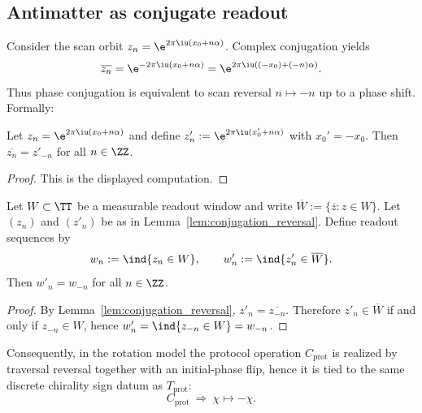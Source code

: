 \subsection{Antimatter as conjugate readout}
\label{subsec:antimatter_duality}

Consider the scan orbit $z_n=\e^{2\pi\iu(x_0+n\alpha)}$.
Complex conjugation yields
\[
\overline{z_n}=\e^{-2\pi\iu(x_0+n\alpha)}=\e^{2\pi\iu((-x_0)+(-n)\alpha)}.
\]
Thus phase conjugation is equivalent to scan reversal $n\mapsto -n$ up to a phase shift.
Formally:
\begin{lemma}\label{lem:conjugation_reversal}
Let $z_n=\e^{2\pi\iu(x_0+n\alpha)}$ and define $z'_n:=\e^{2\pi\iu(x_0'+n\alpha)}$ with $x_0'=-x_0$.
Then $\overline{z_n}=z'_{-n}$ for all $n\in\ZZ$.
\end{lemma}
\begin{proof}
This is the displayed computation.
\end{proof}
\begin{lemma}\label{lem:conjugation_readout_reversal}
Let $W\subset\TT$ be a measurable readout window and write $\overline{W}:=\{\overline{z}:z\in W\}$.
Let $(z_n)$ and $(z'_n)$ be as in Lemma~\ref{lem:conjugation_reversal}.
Define readout sequences by
\[
w_n:=\ind\{z_n\in W\},\qquad
w'_n:=\ind\{z'_n\in \overline{W}\}.
\]
Then $w'_n=w_{-n}$ for all $n\in\ZZ$.
\end{lemma}
\begin{proof}
By Lemma~\ref{lem:conjugation_reversal}, $z'_n=\overline{z_{-n}}$.
Therefore $z'_n\in\overline{W}$ if and only if $z_{-n}\in W$, hence $w'_n=\ind\{z_{-n}\in W\}=w_{-n}$.
\end{proof}
Consequently, in the rotation model the protocol operation $C_{\mathrm{prot}}$ is realized by traversal reversal together with an initial-phase flip, hence it is tied to the same discrete chirality sign datum as $T_{\mathrm{prot}}$:
\[
C_{\mathrm{prot}}\ \Longrightarrow\ \chi\mapsto -\chi.
\]
